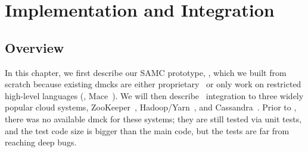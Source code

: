 

\chapter{Implementation and Integration}
\label{sec-impl}

\section{Overview}
In this chapter, we first describe our SAMC prototype, \sampro, which we
built from scratch because existing dmcks are either
proprietary~\cite{Yang+09-Modist} or only work on restricted high-level
languages (\eg, Mace~\cite{Killian+07-LifeDeathMaceMC}).  We will then describe
\sampro\ integration to three widely popular cloud systems,
ZooKeeper~\cite{Hunt+10-ZooKeeperPaper}, Hadoop/Yarn~\cite{Kumar+13-Yarn},
and Cassandra~\cite{Lakshman+09-Cassandra}.  Prior to \sampro, there was no
available dmck for these systems; they are still tested via unit tests, and
the test code size is bigger than the main code, but the tests are far from
reaching deep bugs.


